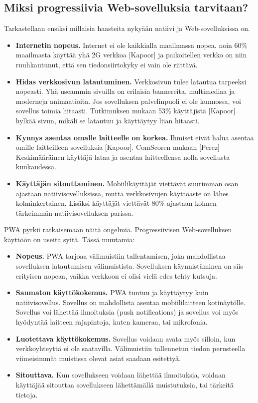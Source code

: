 \documentclass{tktltiki}
\begin{document}
\subsection{Miksi progressiivia Web-sovelluksia tarvitaan?}
\enlargethispage{5mm}

Tarkastellaan ensiksi millaisia haasteita nykyään natiivi ja Web-sovelluksissa on.

\begin{itemize}
  \item \textbf{Internetin nopeus.} Internet ei ole kaikkialla maailmassa nopea. noin 60\% maailmasta käyttää yhä 2G verkkoa [Kapoor] ja paikoitellen verkko on niin ruuhkautunut, että sen tiedonsiirtokyky ei vain ole riittävä.
  \item \textbf{Hidas verkkosivun latautuminen.} Verkkosivun tulee latautua tarpeeksi nopeasti. Yhä useammin sivuilla on erilaisia bannereita, multimediaa ja moderneja animaatioita. Jos sovelluksen palvelinpuoli ei ole kunnossa, voi sovellus toimia hitaasti. Tutkimuksen mukaan 53\% käyttäjistä [Kapoor] hylkää sivun, mikäli se latautuu ja käyttäytyy liian hitaasti.
  \item \textbf{Kynnys asentaa omalle laitteelle on korkea.} Ihmiset eivät halua asentaa omille laitteilleen sovelluksia [Kapoor]. ComScoren mukaan [Perez] Keskimääräinen käyttäjä lataa ja asentaa laitteellensa nolla sovellusta kuukaudessa.
  \item \textbf{Käyttäjän sitouttaminen.} Mobiilikäyttäjät viettävät suurimman osan ajastaan natiivisovelluksissa, mutta verkkosivujen käyttöaste on lähes kolminkertainen. Lisäksi käyttäjät viettävät 80\% ajastaan kolmen tärkeimmän natiivisovelluksen parissa. 
\end{itemize}

PWA pyrkii ratkaisemaan näitä ongelmia. Progressiivisen Web-sovelluksen käyttöön on useita syitä. Tässä muutamia:

\begin{itemize}
  \item \textbf{Nopeus.} PWA tarjoaa välimuistiin tallentamisen, joka mahdollistaa sovelluksen latautumisen välimuistista. Sovelluksen käynnistäminen on siis erityisen nopeaa, vaikka verkkoon ei olisi vielä edes tehty kutsuja.
  \item \textbf{Saumaton käyttökokemus.} PWA tuntuu ja käyttäytyy kuin natiivisovellus. Sovellus on mahdollista asentaa mobiililaitteen kotinäytölle. Sovellus voi lähettää ilmoituksia (push notifications) ja sovellus voi myös hyödyntää laitteen rajapintoja, kuten kameraa, tai mikrofonia. 
  \item \textbf{Luotettava käyttökokemus.} Sovellus voidaan avata myös silloin, kun verkkoyhteyttä ei ole saatavilla. Välimuistiin tallennetun tiedon perusteella viimeisimmät muistissa olevat asiat saadaan esitettyä. 
  \item \textbf{Sitouttava.} Kun sovellukseen voidaan lähettää ilmoituksia, voidaan käyttäjää sitouttaa sovellukseen lähettämällä muistutuksia, tai tärkeitä tietoja. 
\end{itemize}
\end{document}
